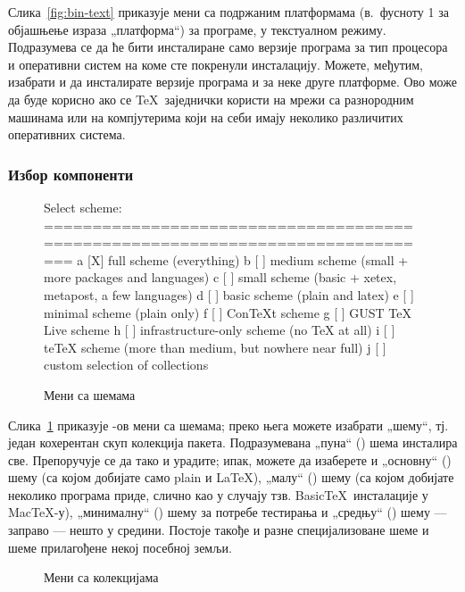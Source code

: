 \documentclass{article}
\begin{document}
Слика~\ref{fig:bin-text} приказује мени са подржаним платформама
(в.~фусноту 1 за објашњење израза „платформа“) за програме, у
текстуалном режиму. Подразумева се да ће бити инсталиране само
верзије програма за тип процесора и оперативни систем на коме сте
покренули инсталацију. Можете, међутим, изабрати и да инсталирате
верзије програма и за неке друге платформе. Ово може да буде корисно
ако се \TeX\ заједнички користи на мрежи са разнородним машинама или
на компјутерима који на себи имају неколико различитих оперативних
система.

\subsubsection{Избор компоненти}
\label{sec:components}

\begin{figure}[tbh]
\begin{boxedverbatim}
Select scheme:
===============================================================================
 a [X] full scheme (everything)
 b [ ] medium scheme (small + more packages and languages)
 c [ ] small scheme (basic + xetex, metapost, a few languages)
 d [ ] basic scheme (plain and latex)
 e [ ] minimal scheme (plain only)
 f [ ] ConTeXt scheme
 g [ ] GUST TeX Live scheme
 h [ ] infrastructure-only scheme (no TeX at all)
 i [ ] teTeX scheme (more than medium, but nowhere near full)
 j [ ] custom selection of collections
\end{boxedverbatim}
\caption{Мени са шемама}\label{fig:scheme-text}
\end{figure}

Слика~\ref{fig:scheme-text} приказује \TL-ов мени са шемама; преко њега
можете изабрати „шему“, тј. један кохерентан скуп колекција пакета.
Подразумевана „пуна“ () шема инсталира све. Препоручује
се да тако и урадите; ипак, можете да изаберете и „основну“
() шему (са којом добијате само plain и \LaTeX{}), 
„малу“ () шему (са којом добијате неколико програма
приде, слично као у случају тзв. Basic\TeX\ инсталације у Mac\TeX-у),
„минималну“ () шему за потребе тестирања и „средњу“
() шему --- заправо  --- нешто у
средини. Постоје такође и разне специјализоване
шеме и шеме прилагођене некој посебној земљи.

\begin{figure}[tb]
\begin{center}
  \caption{Мени са колекцијама}\label{fig:collections-gui}
\end{center}
\end{figure}
\end{document}
